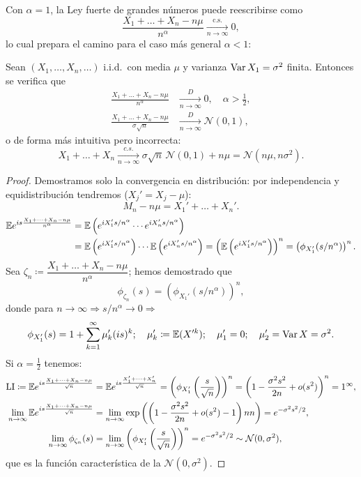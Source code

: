 Con $\alpha = 1$, la Ley fuerte de grandes números puede reescribirse como
\[
  \frac{X_1 + \dots + X_n - n\mu}{n^\alpha} \xrightarrow[n\to\infty]{\text{c.s.}} 0,
\]
lo cual prepara el camino para el caso más general $\alpha < 1$:

\begin{teorema}
Sean $(X_1, \dots, X_n, \dots)$ i.i.d.\ con media $\mu$ y varianza $\operatorname{Var} X_1 = \sigma^2$ finita. Entonces se verifica que
\begin{align*}
  \frac{X_1 + \dots + X_n - n\mu}{n^\alpha} &\xrightarrow[n\to\infty]{D} 0, \quad \alpha > \frac{1}{2}, \\
  \frac{X_1 + \dots + X_n - n\mu}{\sigma\sqrt{n}} &\xrightarrow[n\to\infty]{D} \mathcal{N}(0, 1),
\end{align*}
o de forma más intuitiva pero incorrecta:
\[
  X_1 + \dots + X_n \xrightarrow[n\to\infty]{c.s.} \sigma\sqrt{n}\,\mathcal{N}(0,1) + n\mu = \mathcal{N}(n\mu, n\sigma^2).
\]
\end{teorema}

\begin{proof}
Demostramos solo la convergencia en distribución: por independencia y equidistribución tendremos ($X_j' = X_j - \mu$):
\[
  M_n - n\mu = X_1' + \dots + X_n'.
\]
\begin{align*}
    \mathbb{E} e^{is \frac{X_1 + \dots + X_n - n\mu}{n^\alpha}} & = \mathbb{E}\left(e^{iX_1' s/n^\alpha} \cdots e^{iX_n' s/n^\alpha}\right) \\ & = \mathbb{E}\left(e^{iX_1' s/n^\alpha}\right) \cdots \mathbb{E}\left(e^{iX_n' s/n^\alpha}\right) = \left(\mathbb{E}\left(e^{iX_1' s/n^\alpha}\right)\right)^n = \left(\phi_{X_1'}(s/n^\alpha)\right)^n.
\end{align*}
Sea $\zeta_n \coloneqq \dfrac{X_1 + \dots + X_n - n\mu}{n^\alpha}$; hemos demostrado que
\[
  \phi_{\zeta_n}(s) = \left(\phi_{X_1'}(s/n^\alpha)\right)^n,
\]
donde para $n \to \infty \Rightarrow s/n^\alpha \to 0 \Rightarrow$
\[
  \phi_{X_1'}(s) = 1 + \sum_{k=1}^\infty \mu_k' (is)^k; \quad \mu_k' \coloneqq \mathbb{E}(X'^k); \quad \mu_1' = 0; \quad \mu_2' = \operatorname{Var} X = \sigma^2.
\]
Si $\alpha = \frac{1}{2}$ tenemos:
\begin{align*}
  \text{LI} \coloneqq \mathbb{E} e^{is \frac{X_1 + \dots + X_n - n\mu}{\sqrt{n}}} &= \mathbb{E} e^{is \frac{X_1' + \dots + X_n'}{\sqrt{n}}} = \left(\phi_{X_1'}\left(\frac{s}{\sqrt{n}}\right)\right)^n = \left(1 - \frac{\sigma^2 s^2}{2n} + o(s^2)\right)^n = 1^\infty, \\
  \lim_{n\to\infty} \mathbb{E} e^{is \frac{X_1 + \dots + X_n - n\mu}{\sqrt{n}}} &= \lim_{n\to\infty} \exp\left(\left(1 - \frac{\sigma^2 s^2}{2n} + o(s^2) - 1\right)n n\right) = e^{-\sigma^2 s^2/2}, \\
  \lim_{n\to\infty} \phi_{\zeta_n}(s) &= \lim_{n\to\infty} \left(\phi_{X_1'}\left(\frac{s}{\sqrt{n}}\right)\right)^n = e^{-\sigma^2 s^2/2} \sim \mathcal{N}(0, \sigma^2),
\end{align*}
que es la funci\'on caracter\'istica de la $\mathcal{N}(0, \sigma^2)$.
\end{proof}

